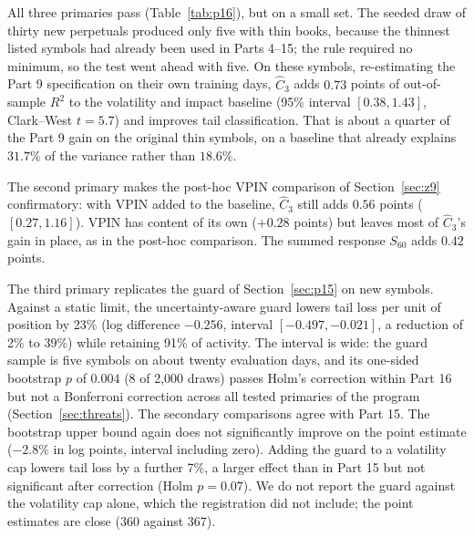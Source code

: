 All three primaries pass (Table~\ref{tab:p16}), but on a small set. The seeded draw of thirty new perpetuals produced only five with thin books, because the thinnest listed symbols had already been used in Parts 4--15; the rule required no minimum, so the test went ahead with five. On these symbols, re-estimating the Part 9 specification on their own training days, $\hat C_3$ adds $0.73$ points of out-of-sample $R^2$ to the volatility and impact baseline (95\% interval $[0.38,1.43]$, Clark--West $t=5.7$) and improves tail classification. That is about a quarter of the Part 9 gain on the original thin symbols, on a baseline that already explains $31.7\%$ of the variance rather than $18.6\%$.

The second primary makes the post-hoc VPIN comparison of Section~\ref{sec:z9} confirmatory: with VPIN added to the baseline, $\hat C_3$ still adds $0.56$ points ($[0.27,1.16]$). VPIN has content of its own ($+0.28$ points) but leaves most of $\hat C_3$'s gain in place, as in the post-hoc comparison. The summed response $S_{60}$ adds $0.42$ points.

The third primary replicates the guard of Section~\ref{sec:p15} on new symbols. Against a static limit, the uncertainty-aware guard lowers tail loss per unit of position by 23\% (log difference $-0.256$, interval $[-0.497,-0.021]$, a reduction of 2\% to 39\%) while retaining 91\% of activity. The interval is wide: the guard sample is five symbols on about twenty evaluation days, and its one-sided bootstrap $p$ of $0.004$ (8 of 2{,}000 draws) passes Holm's correction within Part 16 but not a Bonferroni correction across all tested primaries of the program (Section~\ref{sec:threats}). The secondary comparisons agree with Part 15. The bootstrap upper bound again does not significantly improve on the point estimate ($-2.8\%$ in log points, interval including zero). Adding the guard to a volatility cap lowers tail loss by a further 7\%, a larger effect than in Part 15 but not significant after correction (Holm $p=0.07$). We do not report the guard against the volatility cap alone, which the registration did not include; the point estimates are close (360 against 367).

